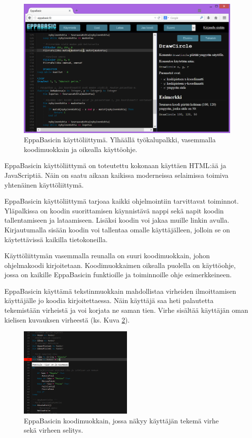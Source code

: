 \begin{figure}[h]
    \centering
    \includegraphics[width=1\textwidth]{kayttoliittyma}
    \caption{EppaBasicin käyttöliittymä. Ylhäällä työkalupalkki, vasemmalla koodimuokkain ja oikealla käyttöohje.}
    \label{img:kayttoliittyma}
\end{figure}

EppaBasicin käyttöliittymä on toteutettu
kokonaan käyttäen HTML:ää ja JavaScriptiä.
Näin on saatu aikaan kaikissa moderneissa
selaimissa toimiva yhtenäinen käyttöliittymä.

EppaBasicin käyttöliittymä tarjoaa kaikki
ohjelmointiin tarvittavat toiminnot.
Yläpalkissa on koodin suorittamisen käynnistävä
nappi sekä napit koodin tallentamiseen ja lataamiseen.
Lisäksi koodin voi jakaa muille linkin avulla.
Kirjautumalla sisään koodin voi tallentaa
omalle käyttäjälleen, jolloin se on käytettävissä
kaikilla tietokoneilla.

Käyttöliittymän vasemmalla reunalla on
suuri koodimuokkain, johon
ohjelmakoodi kirjoitetaan.
Koodimuokkaimen oikealla puolella on
käyttöohje, jossa on kaikille
EppaBasicin funktioille
ja toiminnoille ohje esimerkkeineen.

EppaBasicin käyttämä tekstinmuokkain mahdollistaa
virheiden ilmoittamisen käyttäjälle jo
koodia kirjoitettaessa.
Näin käyttäjä saa heti palautetta tekemistään
virheistä ja voi korjata ne saman tien.
Virhe sisältää käyttäjän oman
kielisen kuvauksen virheestä
(ks. Kuva \ref{img:virhe}).

\begin{figure}[h]
    \centering
    \includegraphics[width=0.5\textwidth]{virhe}
    \caption{EppaBasicin koodimuokkain, jossa näkyy käyttäjän tekemä virhe sekä virheen selitys.}
    \label{img:virhe}
\end{figure}

